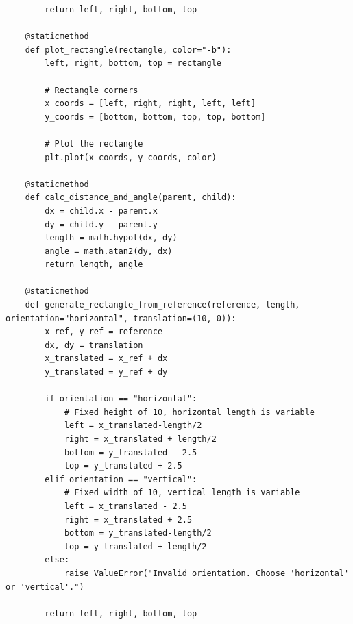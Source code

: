 \documentclass{article}
\begin{document}
\begin{verbatim}
        return left, right, bottom, top

    @staticmethod
    def plot_rectangle(rectangle, color="-b"):
        left, right, bottom, top = rectangle

        # Rectangle corners
        x_coords = [left, right, right, left, left]
        y_coords = [bottom, bottom, top, top, bottom]

        # Plot the rectangle
        plt.plot(x_coords, y_coords, color)

    @staticmethod
    def calc_distance_and_angle(parent, child):
        dx = child.x - parent.x
        dy = child.y - parent.y
        length = math.hypot(dx, dy)
        angle = math.atan2(dy, dx)
        return length, angle

    @staticmethod
    def generate_rectangle_from_reference(reference, length, orientation="horizontal", translation=(10, 0)):
        x_ref, y_ref = reference
        dx, dy = translation
        x_translated = x_ref + dx
        y_translated = y_ref + dy

        if orientation == "horizontal":
            # Fixed height of 10, horizontal length is variable
            left = x_translated-length/2
            right = x_translated + length/2
            bottom = y_translated - 2.5
            top = y_translated + 2.5
        elif orientation == "vertical":
            # Fixed width of 10, vertical length is variable
            left = x_translated - 2.5
            right = x_translated + 2.5
            bottom = y_translated-length/2
            top = y_translated + length/2
        else:
            raise ValueError("Invalid orientation. Choose 'horizontal' or 'vertical'.")

        return left, right, bottom, top
\end{verbatim}
\end{document}
